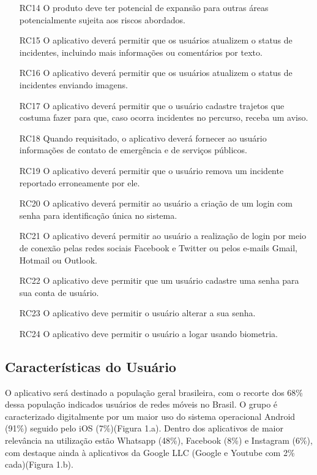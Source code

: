 \documentclass[12pt]{article}
\begin{document}
\begin{enumerate}
    \item [RC14] O produto deve ter potencial de expansão para outras áreas potencialmente sujeita aos riscos abordados.
    \item [RC15] O aplicativo deverá permitir que os usuários atualizem o status de incidentes, incluindo mais informações ou comentários por texto.
    \item [RC16] O aplicativo deverá permitir que os usuários atualizem o status de incidentes enviando imagens.
    \item [RC17] O aplicativo deverá permitir que o usuário cadastre trajetos que costuma fazer para que, caso ocorra incidentes no percurso, receba um aviso.
    \item [RC18] Quando requisitado, o aplicativo deverá fornecer ao usuário informações de contato de emergência e de serviços públicos.
    \item [RC19] O aplicativo deverá permitir que o usuário remova um incidente reportado erroneamente por ele.
    \item [RC20] O aplicativo deverá permitir ao usuário a criação de um login com senha para identificação única no sistema.
    \item [RC21] O aplicativo deverá permitir ao usuário a realização de login por meio de conexão pelas redes sociais Facebook e Twitter ou pelos e-mails Gmail, Hotmail ou Outlook.
    \item [RC22] O aplicativo deve permitir que um usuário cadastre uma senha para sua conta de usuário.
    \item [RC23] O aplicativo deve permitir o usuário alterar a sua senha.
    \item [RC24] O aplicativo deve permitir o usuário a logar usando biometria.
    
    
\end{enumerate}

\subsection{Características do Usuário}
O aplicativo será destinado a população geral brasileira, com o recorte dos 68\% dessa população indicados usuários de redes móveis no Brasil\cite{IBGEPNAD}. O grupo é caracterizado digitalmente por um maior uso do sistema operacional Android (91\%) seguido pelo iOS (7\%)(Figura 1.a). Dentro dos aplicativos de maior relevância na utilização estão Whatsapp (48\%), Facebook (8\%) e Instagram (6\%), com destaque ainda à aplicativos da Google LLC (Google e Youtube com 2\% cada)(Figura 1.b).
\end{document}
